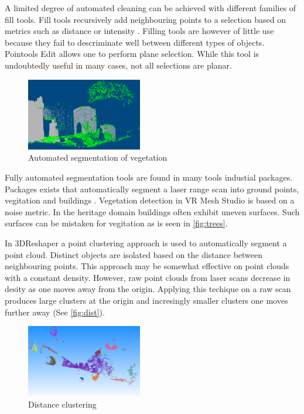 \documentclass[10pt,twocolumn]{article}
\begin{document}
A limited degree of automated cleaning can be achieved with different families of fill tools. Fill tools recursively add neighbouring points to a selection based on metrics such as distance or intensity \cite{Pointools2012}. Filling tools are however of little use because they fail to descriminate well between different types of objects. Pointools Edit \cite{Pointools2012} allows one to perform plane selection. While this tool is undoubtedly useful in many cases, not all selections are planar.

\begin{figure}[htb]
\centering
\includegraphics[width=0.45\textwidth]{pics/vrmesh-veg.png}
\caption{Automated segmentation of vegetation \cite{VirtualGrid2012}}
\label{fig:trees}
\end{figure}

Fully automated segmentation tools are found in many tools industial packages. Packages exists that automatically segment a laser range scan into ground points, vegitation and buildings \cite{Terrasolid2012,VirtualGrid2012,Carlson2012}. Vegetation detection in VR Mesh Studio \cite{Terrasolid2012} is based on a noise metric. In the heritage domain buildings often exhibit uneven surfaces. Such surfaces can be mistaken for vegitation as is seen in \autoref{fig:trees}.

In 3DReshaper \cite{Technodigit2012} a point clustering approach is used to automatically segment a point cloud. Distinct objects are isolated based on the distance between neighbouring points. This approach may be somewhat effective on point clouds with a constant density. However, raw point clouds from laser scans decrease in desity as one moves away from the origin. Applying this techique on a raw scan produces large clusters at the origin and incresingly smaller clusters one moves further away (See \autoref{fig:dist}).

\begin{figure}[htb]
\centering
\includegraphics[width=0.45\textwidth]{pics/clustering.png}
\caption{Distance clustering \cite{Technodigit2012}}
\label{fig:dist}
\end{figure}
\end{document}

